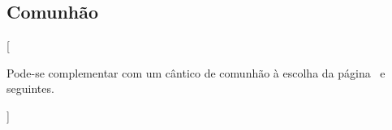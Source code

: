\AllowPageFlush

\subsection{Comunhão}\label{subsection:proprium-sanctorum/in-praesentatione-domini/communio}
[%
  \begin{rubrica}
    Pode-se complementar com um cântico de comunhão à escolha da página~\pageref{appendix:communio-ad-libitum/communio-1} e seguintes.
  \end{rubrica}%
]